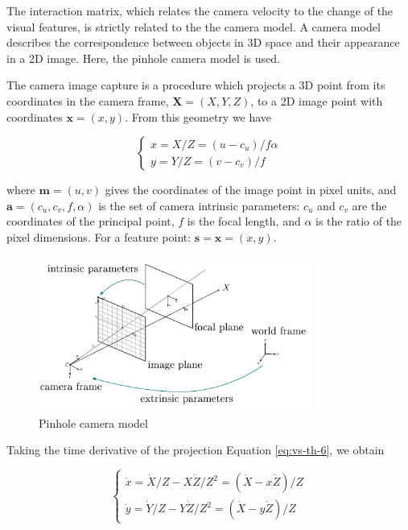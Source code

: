 The interaction matrix, which relates the camera velocity to the change of the visual features, is strictly related to the the camera model. A camera model describes the correspondence between objects in 3D space and their appearance in a 2D image. Here, the pinhole camera model is used.

The camera image capture is a procedure which projects a 3D point from its coordinates in the camera frame, $\bm{X} = (X, Y, Z)$, to a 2D image point with coordinates $\bm{x} = (x, y)$. From this geometry we have

\begin{equation}
\begin{cases}
x = X/Z = (u - c_u) / f \alpha \\
y = Y/Z = (v - c_v) / f
\end{cases}
\label{eq:vs-th-6}
\end{equation}

where $\bm{m} = (u, v)$ gives the coordinates of the image point in pixel units, and $\bm{a} = (c_u, c_v, f, \alpha)$ is the set of camera intrinsic parameters: $c_u$ and $c_v$ are the coordinates of the principal point, $f$ is the focal length, and $\alpha$ is the ratio of the pixel dimensions. For a feature point: $\bm{s} = \bm{x} = (x, y)$.

\begin{figure}[ht]
	\centering
	\includegraphics[keepaspectratio, width=9cm]{content/chapter_02/images/pinhole_camera.png}
	\caption{Pinhole camera model}
	\label{fig:poster-logo-block}
\end{figure}

Taking the time derivative of the projection Equation \ref{eq:vs-th-6}, we obtain

\begin{equation}
\begin{cases}
\dot{x} = \dot{X}/Z - X\dot{Z}/Z^2 = (\dot{X} - x \dot{Z})/Z \\
\dot{y} = \dot{Y}/Z - Y\dot{Z}/Z^2 = (\dot{X} - y \dot{Z})/Z
\end{cases}
\label{eq:vs-th-7}
\end{equation}

